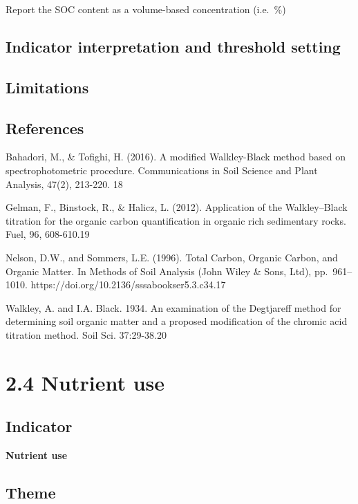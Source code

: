 \documentclass[
  letterpaper,
  DIV=11,
  numbers=noendperiod]{scrreprt}
\begin{document}
Report the SOC content as a volume-based concentration (i.e.~\%)

\section{Indicator interpretation and threshold
setting}\label{indicator-interpretation-and-threshold-setting-2}

\section{Limitations}\label{limitations-2}

\section{References}\label{references-2}

Bahadori, M., \& Tofighi, H. (2016). A modified Walkley-Black method
based on spectrophotometric procedure. Communications in Soil Science
and Plant Analysis, 47(2), 213-220. 18

Gelman, F., Binstock, R., \& Halicz, L. (2012). Application of the
Walkley--Black titration for the organic carbon quantification in
organic rich sedimentary rocks. Fuel, 96, 608-610.19

Nelson, D.W., and Sommers, L.E. (1996). Total Carbon, Organic Carbon,
and Organic Matter. In Methods of Soil Analysis (John Wiley \& Sons,
Ltd), pp.~961--1010. https://doi.org/10.2136/sssabookser5.3.c34.17

Walkley, A. and I.A. Black. 1934. An examination of the Degtjareff
method for determining soil organic matter and a proposed modification
of the chromic acid titration method. Soil Sci. 37:29-38.20

\chapter{2.4 Nutrient use}\label{nutrient-use}

\section{Indicator}\label{indicator-2}

\textbf{Nutrient use}

\section{Theme}\label{theme-2}
\end{document}
